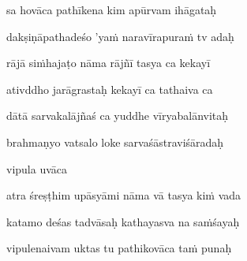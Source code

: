 sa hovāca pathīkena kim apūrvam ihāgataḥ\thinspace{\dandab} \dontdisplaylinenum
{}

dakṣiṇāpathadeśo 'yaṁ naravīrapuraṁ tv adaḥ \veg\dontdisplaylinenum
{}

rājā siṁhajaṭo nāma rājñī tasya ca kekayī\thinspace{\dandab} \dontdisplaylinenum
{}

ativddho jarāgrastaḥ kekayī ca tathaiva ca \veg\dontdisplaylinenum
{}

dātā sarvakalājñaś ca yuddhe vīryabalānvitaḥ\thinspace{\dandab} \dontdisplaylinenum
{}

brahmaṇyo vatsalo loke sarvaśāstraviśāradaḥ \veg\dontdisplaylinenum

vipula uvāca~{\dandab}\dontdisplaylinenum 

atra śreṣṭhim upāsyāmi nāma vā tasya kiṁ vada\thinspace{\danda} \dontdisplaylinenum
{}

katamo deśas tadvāsaḥ kathayasva na saṁśayaḥ \veg\dontdisplaylinenum
{}

vipulenaivam uktas tu pathikovāca taṁ punaḥ\thinspace{\dandab} \dontdisplaylinenum
{}

